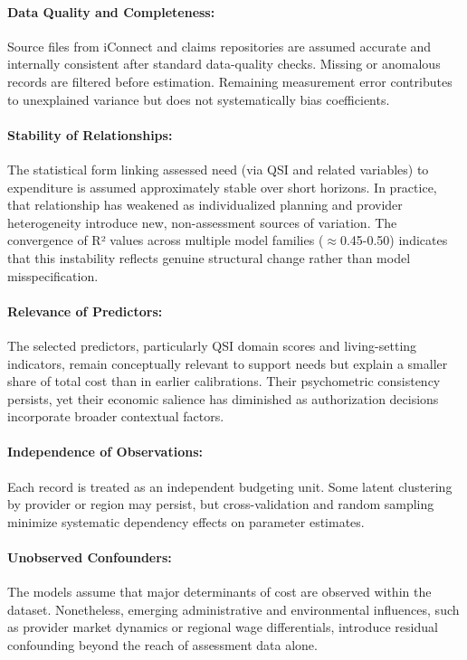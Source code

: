 \paragraph{Data Quality and Completeness:} Source files from iConnect and claims repositories are assumed accurate and internally consistent after standard data-quality checks.  Missing or anomalous records are filtered before estimation.  Remaining measurement error contributes to unexplained variance but does not systematically bias coefficients. 
 
\paragraph{Stability of Relationships:} The statistical form linking assessed need (via QSI and related variables) to expenditure is assumed approximately stable over short horizons.  In practice, that relationship has weakened as individualized planning and provider heterogeneity introduce new, non-assessment sources of variation.  The convergence of R² values across multiple model families ($\approx$0.45-0.50) indicates that this instability reflects genuine structural change rather than model misspecification.
 
\paragraph{Relevance of Predictors:} The selected predictors, particularly QSI domain scores and living-setting indicators, remain conceptually relevant to support needs but explain a smaller share of total cost than in earlier calibrations.  Their psychometric consistency persists, yet their economic salience has diminished as authorization decisions incorporate broader contextual factors.
 
\paragraph{Independence of Observations:} Each record is treated as an independent budgeting unit.  Some latent clustering by provider or region may persist, but cross-validation and random sampling minimize systematic dependency effects on parameter estimates.
 
\paragraph{Unobserved Confounders:} The models assume that major determinants of cost are observed within the dataset.  Nonetheless, emerging administrative and environmental influences, such as provider market dynamics or regional wage differentials, introduce residual confounding beyond the reach of assessment data alone.
 
